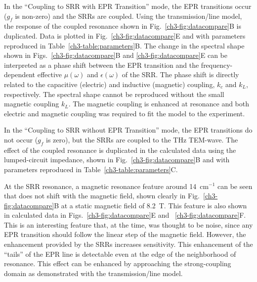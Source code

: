 In the ``Coupling to SRR with EPR Transition'' mode, the EPR transitions occur ($g_f$ is non-zero) and the SRRs are coupled. Using the transmission\-/line model, the response of the coupled resonance shown in Fig.~\ref{ch3-fig:datacompare}B is duplicated. Data is plotted in Fig.~\ref{ch3-fig:datacompare}E and with parameters reproduced in Table~\ref{ch3-table:parameters}B. The change in the spectral shape shown in Figs.~\ref{ch3-fig:datacompare}B and \ref{ch3-fig:datacompare}E can be interpreted as a phase shift between the EPR transition and the frequency-dependent effective $\mu(\omega)$ and $\epsilon(\omega)$ of the SRR. The phase shift is directly related to the capacitive (electric) and inductive (magnetic) coupling, $k_c$ and $k_L$, respectively. The spectral shape cannot be reproduced without the small magnetic coupling $k_L$. The magnetic coupling is enhanced at resonance and both electric and magnetic coupling was required to fit the model to the experiment.

In the ``Coupling to SRR without EPR Transition'' mode, the EPR transitions do not occur ($g_f$ is zero), but the SRRs are coupled to the THz TEM-wave. The effect of the coupled resonance is duplicated in the calculated data using the lumped-circuit impedance, shown in Fig.~\ref{ch3-fig:datacompare}B and with parameters reproduced in Table~\ref{ch3-table:parameters}C. 

At the SRR resonance, a magnetic resonance feature around 14~cm$^{-1}$ can be seen that does not shift with the magnetic field, shown clearly in Fig.~\ref{ch3-fig:datacompare}B at a static magnetic field of 8.2~T. This feature is also shown in calculated data in Figs.~\ref{ch3-fig:datacompare}E and ~\ref{ch3-fig:datacompare}F. This is an interesting feature that, at the time, was thought to be noise, since any EPR transition should follow the linear step of the magnetic field. However, the enhancement provided by the SRRs increases sensitivity. This enhancement of the ``tails'' of the EPR line is detectable even at the edge of the neighborhood of resonance. This effect can be enhanced by approaching the strong-coupling domain as demonstrated with the transmission\-/line model.

